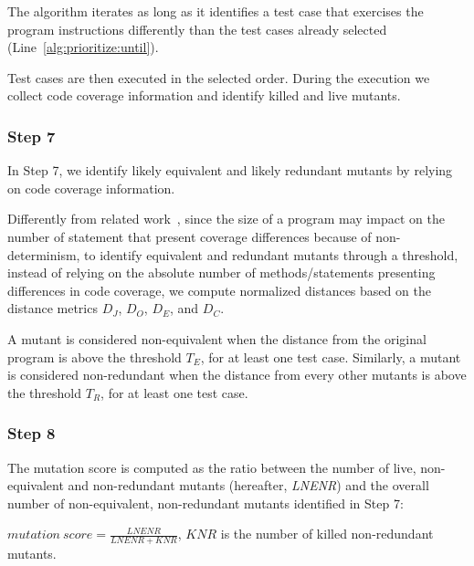 
The algorithm iterates as long as it identifies a test case that exercises 
the program instructions differently than the test cases already selected (Line~\ref{alg:prioritize:until}).

Test cases are then executed in the selected order. During the execution we collect code coverage information and identify killed and live mutants.



\subsubsection{Step 7}


In Step 7, we identify likely equivalent and likely redundant mutants by relying on code coverage information.

Differently from related work~\cite{schuler2013covering}, since the size of a program may impact on the number of statement that present coverage differences because of non-determinism, 
to identify equivalent and redundant mutants through a threshold, instead of relying on the absolute number of methods/statements presenting differences in code coverage, we compute normalized distances based on the distance metrics $D_J$, $D_O$, $D_E$, and $D_C$. 

A mutant is considered non-equivalent when the distance from the original program is above the threshold $T_E$, for at least one test case.
Similarly, a mutant is considered non-redundant when the distance from every other mutants is above the threshold $T_R$, for at least one test case.

\subsubsection{Step 8}

The mutation score is computed as the ratio between the number of live, non-equivalent and non-redundant mutants (hereafter, \emph{LNENR}) and the overall number of non-equivalent, non-redundant mutants identified in Step 7:

$\mathit{mutation}\ \mathit{score} = \frac{\mathit{LNENR}}{\mathit{LNENR}+\mathit{KNR}}$,
$\mathit{KNR}$ is the number of killed non-redundant mutants.

%
%
%

